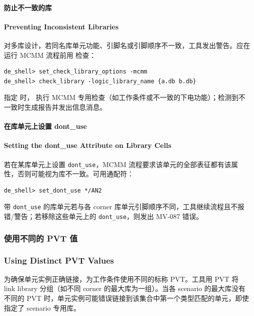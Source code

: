 \paragraph{防止不一致的库}
\paragraph*{Preventing Inconsistent Libraries}

对多库设计，若同名库单元功能、引脚名或引脚顺序不一致，工具发出警告。应在运行 MCMM 流程前用  检查：
\begin{lstlisting}
de_shell> set_check_library_options -mcmm
de_shell> check_library -logic_library_name {a.db b.db}
\end{lstlisting}

指定  时， 执行 MCMM 专用检查（如工作条件或不一致的下电功能）；检测到不一致时生成报告并发出信息消息。

\paragraph{在库单元上设置 dont\_use}
\paragraph*{Setting the dont\_use Attribute on Library Cells}

若在某库单元上设置 \texttt{dont\_use}，MCMM 流程要求该单元的全部表征都有该属性，否则可能视为库不一致。可用通配符：
\begin{lstlisting}
de_shell> set_dont_use */AN2
\end{lstlisting}

带 \texttt{dont\_use} 的库单元若与各 corner 库单元引脚顺序不同，工具继续流程且不报错/警告；若移除这些单元上的 \texttt{dont\_use}，则发出 MV-087 错误。

\subsubsection{使用不同的 PVT 值}
\subsubsection*{Using Distinct PVT Values}

为确保单元实例正确链接，为工作条件使用不同的标称 PVT。工具用 PVT 将 link library 分组（如不同 corner 的最大库为一组）。当各 scenario 的最大库没有不同的 PVT 时，单元实例可能错误链接到该集合中第一个类型匹配的单元，即使  指定了 scenario 专用库。

